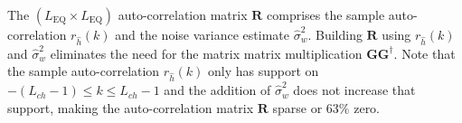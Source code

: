 The $(L_\text{EQ} \times L_\text{EQ})$ auto-correlation matrix $\mathbf{R}$ comprises the sample auto-correlation $r_{\hat{h}}(k)$ and the noise variance estimate $\hat{\sigma}^2_w$.
Building $\mathbf{R}$ using $r_{\hat{h}}(k)$ and $\hat{\sigma}^2_w$ eliminates the need for the matrix matrix multiplication $\mathbf{G}\mathbf{G}^\dagger$.
Note that the sample auto-correlation $r_{\hat{h}}(k)$ only has support on $-(L_{ch}-1) \leq k \leq L_{ch}-1$ and the addition of $\hat{\sigma}^2_w$ does not increase that support, making the auto-correlation matrix $\mathbf{R}$ sparse or $63\%$ zero.


